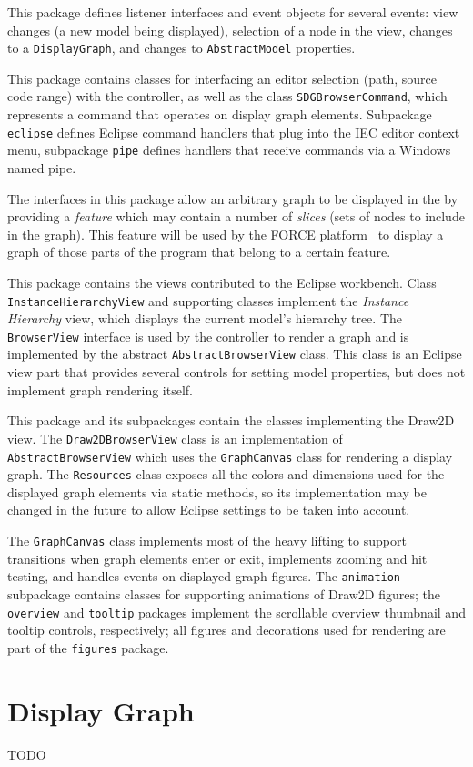 \begin{description}
   This package defines listener interfaces and event objects for several events: view changes (a new 
  model being displayed), selection of a node in the view, changes to a \lstinline|DisplayGraph|, and changes to 
  \lstinline|AbstractModel| properties.
  
   This package contains classes for interfacing an editor selection (path, source code range) with 
  the \SB controller, as well as the class \lstinline|SDGBrowserCommand|, which represents a command that operates on 
  display graph elements. Subpackage \lstinline|eclipse| defines Eclipse command handlers that plug into the IEC editor 
  context menu, subpackage \lstinline|pipe| defines handlers that receive commands via a Windows named pipe.
  
   The interfaces in this package allow an arbitrary graph to be displayed in the \SB by 
  providing a \emph{feature} which may contain a number of \emph{slices} (sets of nodes to include in the graph). This 
  feature will be used by the FORCE platform~\cite{HinterreiterDA} to display a graph of those parts of the program 
  that belong to a certain feature.
  
   This package contains the views contributed to the Eclipse workbench. Class 
  \lstinline|InstanceHierarchyView| and supporting classes implement the \emph{Instance Hierarchy} view, which displays 
  the current model's hierarchy tree. The \lstinline|BrowserView| interface is used by the controller to render a graph 
  and is implemented by the abstract \lstinline|AbstractBrowserView| class. This class is an Eclipse view part that 
  provides several controls for setting model properties, but does not implement graph rendering itself.
  
   This package and its subpackages contain the classes implementing the Draw2D\footnotemark{} 
  \SB view. The \lstinline|Draw2DBrowserView| class is an implementation of \lstinline|AbstractBrowserView| which uses 
  the \lstinline|GraphCanvas| class for rendering a display graph. The \lstinline|Resources| class exposes all the 
  colors and dimensions used for the displayed graph elements via static methods, so its implementation may be changed 
  in the future to allow Eclipse settings to be taken into account.
  
  
  The \lstinline|GraphCanvas| class implements most of the heavy lifting to support transitions when graph elements 
  enter or exit, implements zooming and hit testing, and handles events on displayed graph figures. The 
  \lstinline|animation| subpackage contains classes for supporting animations of Draw2D figures; the 
  \lstinline|overview| and \lstinline|tooltip| packages implement the scrollable overview thumbnail and tooltip 
  controls, respectively; all figures and decorations used for rendering are part of the \lstinline|figures| package.
\end{description}


\section{Display Graph}

TODO
